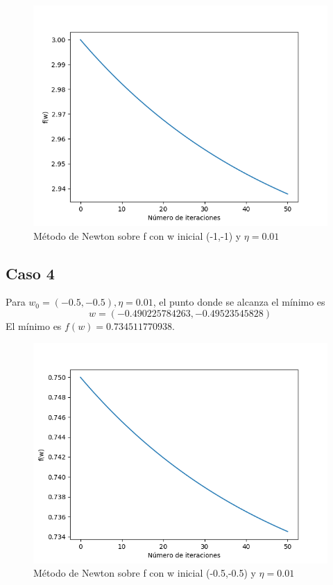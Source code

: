 \begin{figure}[H] %
	\centering
	\includegraphics[scale=0.6]{bonus3.png}  %
	\caption{Método de Newton sobre f con w inicial (-1,-1) y $\eta = 0.01$} 
	\label{fig:bon3}
\end{figure}



\subsection{Caso 4}

Para $w_0=(-0.5,-0.5), \eta = 0.01$, el punto donde se alcanza el mínimo es $$w=(-0.490225784263 , -0.49523545828)$$ El mínimo es $f(w) = 0.734511770938$.

\begin{figure}[H] %
	\centering
	\includegraphics[scale=0.6]{bonus4.png}  %
	\caption{Método de Newton sobre f con w inicial (-0.5,-0.5) y $\eta = 0.01$} 
	\label{fig:bon4}
\end{figure}


